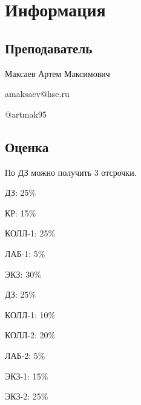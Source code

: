 \section{Информация}

\subsection{Преподаватель}
Максаев Артем Максимович

amaksaev@hse.ru 

@artmak95

\subsection{Оценка}

По ДЗ можно получить \( 3 \) отсрочки.


ДЗ: 25\%

КР: 15\%

КОЛЛ-1: 25\%

ЛАБ-1: 5\%

ЭКЗ: 30\%


ДЗ: 25\%

КОЛЛ-1: 10\%

КОЛЛ-2: 20\%

ЛАБ-2: 5\%

ЭКЗ-1: 15\%

ЭКЗ-2: 25\%
